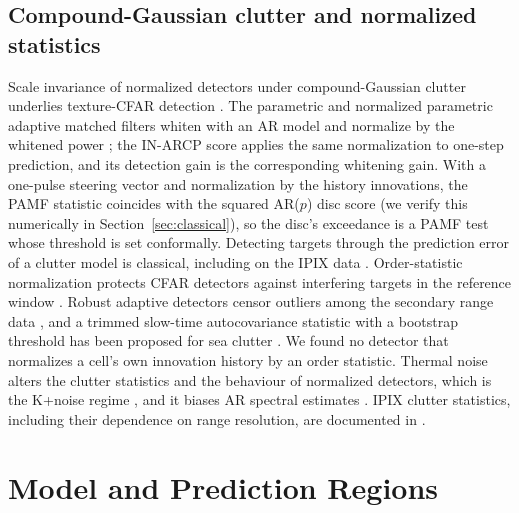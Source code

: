 \documentclass[journal]{IEEEtran}
\begin{document}
\subsection{Compound-Gaussian clutter and normalized statistics}
Scale invariance of normalized detectors under compound-Gaussian clutter underlies texture-CFAR detection \cite{conte1995,kraut1999,ollila2012,sangston2012}. The parametric and normalized parametric adaptive matched filters whiten with an AR model and normalize by the whitened power \cite{roman2000,michels2000}; the IN-ARCP score applies the same normalization to one-step prediction, and its detection gain is the corresponding whitening gain. With a one-pulse steering vector and normalization by the history innovations, the PAMF statistic coincides with the squared AR($p$) disc score (we verify this numerically in Section~\ref{sec:classical}), so the disc's exceedance is a PAMF test whose threshold is set conformally. Detecting targets through the prediction error of a clutter model is classical, including on the IPIX data \cite{haykin1995}. Order-statistic normalization protects CFAR detectors against interfering targets in the reference window \cite{rohling1983}. Robust adaptive detectors censor outliers among the secondary range data \cite{kononov2024}, and a trimmed slow-time autocovariance statistic with a bootstrap threshold has been proposed for sea clutter \cite{qu2025sact}. We found no detector that normalizes a cell's own innovation history by an order statistic. Thermal noise alters the clutter statistics and the behaviour of normalized detectors, which is the K+noise regime \cite{watts1987,gini1997,watts2007cfarloss,ward2013}, and it biases AR spectral estimates \cite{kay1980}. IPIX clutter statistics, including their dependence on range resolution, are documented in \cite{farina1997,conte2004resolution}.

\section{Model and Prediction Regions}
\end{document}
